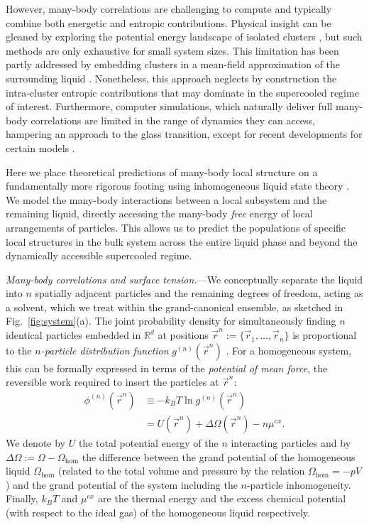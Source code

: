 \documentclass[11pt,twoside]{report}
\begin{document}
However, many-body correlations are challenging to compute and typically combine both energetic and entropic contributions.
Physical insight can be gleaned by exploring the potential energy landscape of isolated clusters \cite{Wales2004,Arkus2009}, but such methods are only exhaustive for small system sizes.
This limitation has been partly addressed by embedding clusters in a mean-field approximation of the surrounding liquid \cite{Mossa2003}.
Nonetheless, this approach neglects by construction the intra-cluster entropic contributions that may dominate in the supercooled regime of interest.
Furthermore, computer simulations, which naturally deliver full many-body correlations are limited in the range of dynamics they can access, hampering an approach to the glass transition, except for recent developments for certain models \cite{Berthier2016}.

Here we place theoretical predictions of many-body local structure on a fundamentally more rigorous footing using inhomogeneous liquid state theory \cite{Evans1979}.
We model the many-body interactions between a local subsystem and the remaining liquid, directly accessing the many-body \textit{free} energy of local arrangements of particles.
This allows us to predict the populations of specific local structures in the bulk system across the entire liquid phase and beyond the dynamically accessible supercooled regime.

\emph{Many-body correlations and surface tension.}---We conceptually separate the liquid into $n$ spatially adjacent particles and the remaining degrees of freedom, acting as a solvent, which we treat within the grand-canonical ensemble, as sketched in Fig.\ \ref{fig:system}(a).
The joint probability density for simultaneously finding $n$ identical particles embedded in $\mathbb{R}^d$ at positions $\vec{r}^n := \{\vec{r}_1, \dots,\vec{r}_n\}$ is proportional to the \emph{$n$-particle distribution function} $g^{(n)}(\vec{r}^n)$ \cite{Hansen2013}.
For a homogeneous system, this can be formally expressed in terms of the \emph{potential of mean force}, the reversible work required to insert the particles at $\vec{r}^n$:
\begin{equation}\label{eq:potential-mean-force}
  \begin{split}
    \phi^{(n)}(\vec{r}^n) &\equiv - k_B T \ln g^{(n)}(\vec{r}^n) \\
    &= U(\vec{r}^n) + \Delta \Omega(\vec{r}^n) - n\mu^{ex}.
  \end{split}
\end{equation}
We denote by $U$ the total potential energy of the $n$ interacting particles and by $\Delta\Omega := \Omega - \Omega_\textrm{hom}$ the difference between the grand potential of the homogeneous liquid $\Omega_\textrm{hom}$ (related to the total volume and pressure by the relation $\Omega_\textrm{hom} = -pV$) and the grand potential of the system including the $n$-particle inhomogeneity. Finally, $k_B T$ and $\mu^{ex}$ are the thermal energy and the excess chemical potential (with respect to the ideal gas) of the homogeneous liquid respectively.
\end{document}
